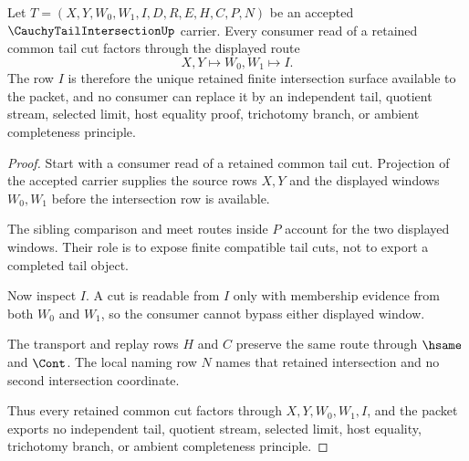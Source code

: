 \begin{theorem}
\label{thm:cauchy-tail-intersection-window-meet}
Let $T=(X,Y,W_0,W_1,I,D,R,E,H,C,P,N)$ be an accepted $\CauchyTailIntersectionUp$ carrier. Every consumer read of a retained common tail cut factors through the displayed route
$$
X,Y \longmapsto W_0,W_1 \longmapsto I .
$$
The row $I$ is therefore the unique retained finite intersection surface available to the packet, and no consumer can replace it by an independent tail, quotient stream, selected limit, host equality proof, trichotomy branch, or ambient completeness principle.
\end{theorem}
\begin{proof}
Start with a consumer read of a retained common tail cut. Projection of the accepted carrier supplies the source rows $X,Y$ and the displayed windows $W_0,W_1$ before the intersection row is available.

The sibling comparison and meet routes inside $P$ account for the two displayed windows. Their role is to expose finite compatible tail cuts, not to export a completed tail object.

Now inspect $I$. A cut is readable from $I$ only with membership evidence from both $W_0$ and $W_1$, so the consumer cannot bypass either displayed window.

The transport and replay rows $H$ and $C$ preserve the same route through $\hsame$ and $\Cont$. The local naming row $N$ names that retained intersection and no second intersection coordinate.

Thus every retained common cut factors through $X,Y,W_0,W_1,I$, and the packet exports no independent tail, quotient stream, selected limit, host equality, trichotomy branch, or ambient completeness principle.
\end{proof}

